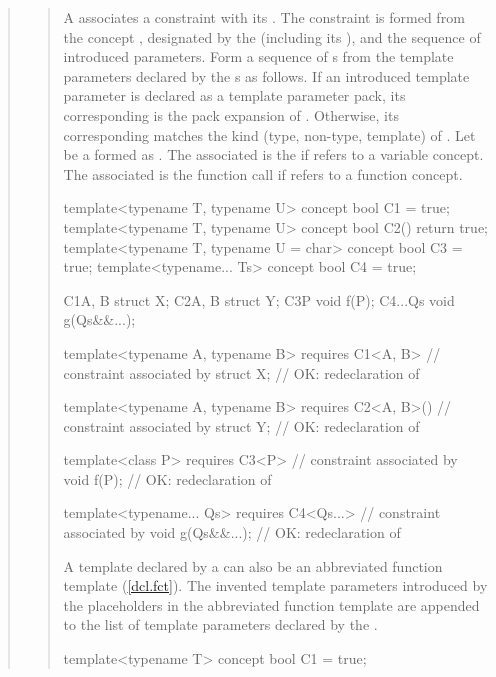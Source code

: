 \begin{quote}
\begin{quote}
\pnum
A  associates a constraint with its
.
% 
The constraint is formed from the concept , designated by the
 (including its
), 
and the sequence of introduced parameters.
% 
Form a sequence of s
 from the template parameters declared by the
s as follows. 
% 
If an introduced template parameter  is declared as a template 
parameter pack, its corresponding  is the pack
expansion of . 
% 
% 
Otherwise, its corresponding  matches the 
kind (type, non-type, template) of .
% 
Let  be a 
formed as .
% 
The associated  is
the  
if  refers to a variable concept. 
% 
The associated  is
the function call  if  refers to a function 
concept.
% 
\enterexample
\begin{codeblock}
template<typename T, typename U> concept bool C1 = true;
template<typename T, typename U> concept bool C2() { return true; }
template<typename T, typename U = char> concept bool C3 = true;
template<typename... Ts> concept bool C4 = true;

C1{A, B} struct X;
C2{A, B} struct Y;
C3{P} void f(P);
C4{...Qs} void g(Qs&&...);

template<typename A, typename B> 
  requires C1<A, B> // constraint associated by 
    struct X;       // OK: redeclaration of 

template<typename A, typename B> 
  requires C2<A, B>()  // constraint associated by 
    struct Y;          // OK: redeclaration of 

template<class P>
  requires C3<P> // constraint associated by 
    void f(P);   // OK: redeclaration of 

template<typename... Qs>
  requires C4<Qs...> // constraint associated by 
    void g(Qs&&...); // OK: redeclaration of 
\end{codeblock}
\exitexample


\pnum
A template declared by a  can also be 
an abbreviated function template (\ref{dcl.fct}). 
% 
The invented template parameters introduced by the placeholders in the 
abbreviated function template are appended to the list of template parameters 
declared by the .
% 
\enterexample
\begin{codeblock}
template<typename T> concept bool C1 = true;


\end{codeblock}
\end{quote}
\end{quote}
